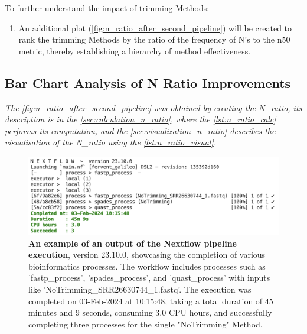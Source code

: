 To further understand the impact of \gls{trimming} Methods:
\begin{enumerate}
  \item An additional plot (\autoref{fig:n_ratio_after_second_pipeline}) will be created to rank the \gls{trimming} Methods by the ratio of the frequency of N's to the \gls{n50} metric, thereby establishing a hierarchy of method effectiveness.
\end{enumerate}

\subsection{Bar Chart Analysis of N Ratio Improvements} 

\textit{The \autoref{fig:n_ratio_after_second_pipeline} was obtained by creating the N\_ratio, its description is in the  \autoref{sec:calculation_n_ratio}, where the \autoref{lst:n_ratio_calc} performs its computation, and the \autoref{sec:visualization_n_ratio} describes the visualisation of the N\_ratio using the  \autoref{lst:n_ratio_visual}.}

\begin{figure}[h!]
\centering
\includegraphics[width=\linewidth]{resources/images/nextflow_output.png}
\caption{\textbf{An example of an output of the Nextflow pipeline execution}, version 23.10.0, showcasing the completion of various bioinformatics processes. The workflow includes processes such as 'fastp\_process', 'spades\_process', and 'quast\_process' with inputs like 'NoTrimming\_SRR26630744\_1.fastq'. The execution was completed on 03-Feb-2024 at 10:15:48, taking a total duration of 45 minutes and 9 seconds, consuming 3.0 CPU hours, and successfully completing three processes for the single "NoTrimming" Method.}
\label{fig:nextflow_output}
\end{figure}

